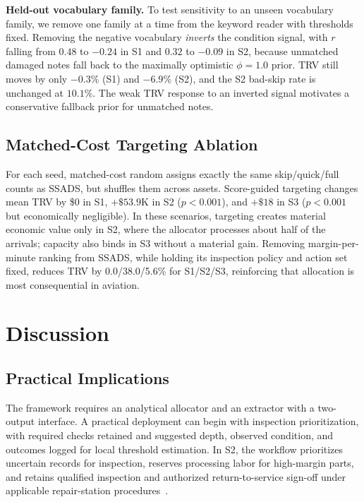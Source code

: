 \documentclass[a4paper,conference]{IEEEtran}
\begin{document}
\smallskip\noindent\textbf{Held-out vocabulary family.} To test sensitivity to an
unseen vocabulary family, we remove one family at a time from the keyword reader
with thresholds fixed. Removing the negative
vocabulary \emph{inverts} the condition signal, with $r$ falling from $0.48$ to
$-0.24$ in S1 and $0.32$ to $-0.09$ in S2, because unmatched damaged notes fall
back to the maximally optimistic $\phi{=}1.0$ prior. TRV still moves by only
$-0.3\%$ (S1) and $-6.9\%$ (S2), and the S2 bad-skip rate is unchanged at
$10.1\%$. The weak TRV response to an inverted signal motivates a conservative
fallback prior for unmatched notes.

\subsection{Matched-Cost Targeting Ablation}\label{sec:ablation}
For each seed, matched-cost random assigns exactly the same skip/quick/full counts
as SSADS, but shuffles them across assets. Score-guided targeting changes mean TRV by
\$0 in S1, $+\$53.9$K in S2 ($p{<}0.001$), and $+\$18$ in S3
($p{<}0.001$ but economically negligible). In these scenarios, targeting creates
material economic value only in S2, where the allocator processes about half of the
arrivals; capacity also binds in S3 without a material gain. Removing
margin-per-minute ranking from SSADS, while holding its inspection policy and
action set fixed, reduces TRV by
0.0/38.0/5.6\% for S1/S2/S3, reinforcing
that allocation is most consequential in aviation.

\section{Discussion}

\subsection{Practical Implications}
The framework requires an analytical allocator and an extractor with a two-output
interface. A practical deployment can begin with inspection prioritization, with
required checks retained and suggested depth, observed condition, and outcomes
logged for local threshold estimation. In S2, the workflow prioritizes uncertain
records for inspection, reserves processing labor for high-margin parts, and retains
qualified inspection and authorized return-to-service sign-off under applicable
repair-station procedures~\cite{eCFRPart145}.
\end{document}
